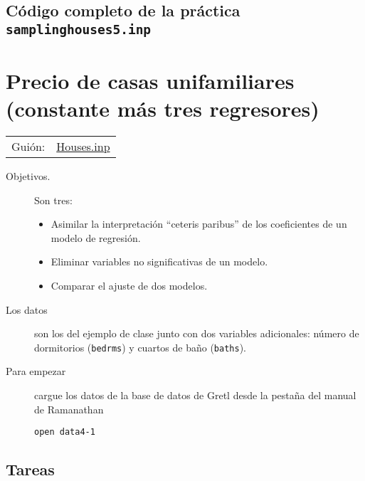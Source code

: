 \documentclass[11pt]{article}
\begin{document}
\vspace{10pt}
\noindent
\subsection{Código completo de la práctica \texttt{samplinghouses5.inp}}
\label{sec:org8b6cbcc}
\vspace{10pt}

\clearpage


\section{Precio de casas unifamiliares (constante más tres regresores)}
\label{sec:orge6d7877}
\begin{center}
\begin{tabular}{ll}
Guión: & \href{https://github.com/mbujosab/Ectr/tree/master/Practicas/Gretl/scripts/Houses.inp}{Houses.inp}\\[0pt]
\end{tabular}
\end{center}


\begin{description}
\item[{Objetivos.}] Son tres:
\begin{itemize}
\item Asimilar la interpretación ``ceteris paribus'' de los coeficientes de un modelo de regresión.
\item Eliminar variables no significativas de un modelo.
\item Comparar el ajuste de dos modelos.
\end{itemize}

\item[{Los datos}] son los del ejemplo de clase junto con dos variables
adicionales: número de dormitorios (\texttt{bedrms}) y cuartos de baño
(\texttt{baths}).

\item[{Para empezar}] cargue los datos de la base de datos de Gretl desde
la pestaña del manual de Ramanathan
\begin{verbatim}
open data4-1
\end{verbatim}
\end{description}

\subsection{Tareas}
\label{sec:org47dda6c}
\end{document}
